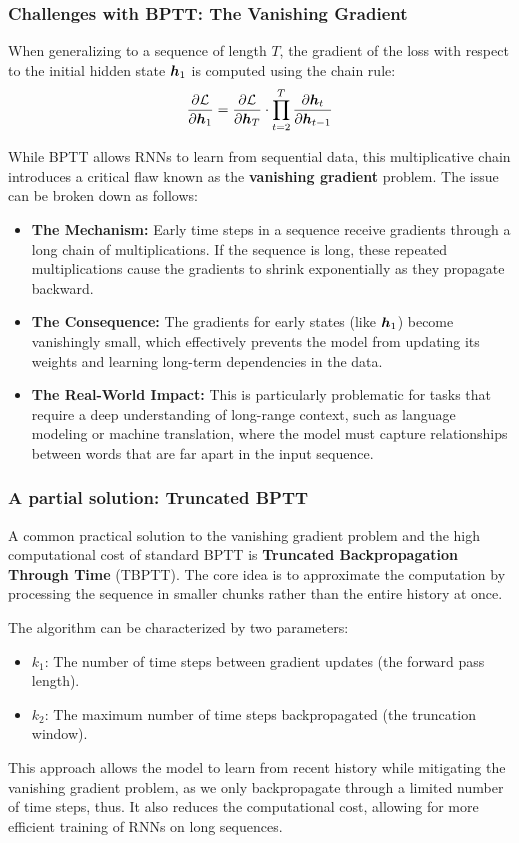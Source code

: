 \subsubsection{Challenges with BPTT: The Vanishing Gradient}

When generalizing to a sequence of length $T$, the gradient of the loss with respect to the initial hidden state $\boldsymbol{h}_1$ is computed using the chain rule:
\begin{equation}
    \frac{\partial \mathcal{L}}{\partial \boldsymbol{h}_1} = \frac{\partial \mathcal{L}}{\partial \boldsymbol{h}_T} \cdot \prod_{t=2}^{T} \frac{\partial \boldsymbol{h}_t}{\partial \boldsymbol{h}_{t-1}}
\end{equation}

While BPTT allows RNNs to learn from sequential data, this multiplicative chain introduces a critical flaw known as the \textbf{vanishing gradient} problem. The issue can be broken down as follows:

\begin{itemize}
    \item \textbf{The Mechanism:} Early time steps in a sequence receive gradients through a long chain of multiplications. If the sequence is long, these repeated multiplications cause the gradients to shrink exponentially as they propagate backward.
    \item \textbf{The Consequence:} The gradients for early states (like $\boldsymbol{h}_1$) become vanishingly small, which effectively prevents the model from updating its weights and learning long-term dependencies in the data.
    \item \textbf{The Real-World Impact:} This is particularly problematic for tasks that require a deep understanding of long-range context, such as language modeling or machine translation, where the model must capture relationships between words that are far apart in the input sequence.
\end{itemize}

\subsubsection{A partial solution: Truncated BPTT}
A common practical solution to the vanishing gradient problem and the high computational cost of standard BPTT is \textbf{Truncated Backpropagation Through Time} (TBPTT).
The core idea is to approximate the computation by processing the sequence in smaller chunks rather than the entire history at once.

The algorithm can be characterized by two parameters:
\begin{itemize}
    \item $k_1$: The number of time steps between gradient updates (the forward pass length).
    \item $k_2$: The maximum number of time steps backpropagated (the truncation window).
\end{itemize}
This approach allows the model to learn from recent history while mitigating the vanishing gradient problem, as we only backpropagate through a limited number of time steps,
thus. It also reduces the computational cost, allowing for more efficient training of RNNs on long sequences.

